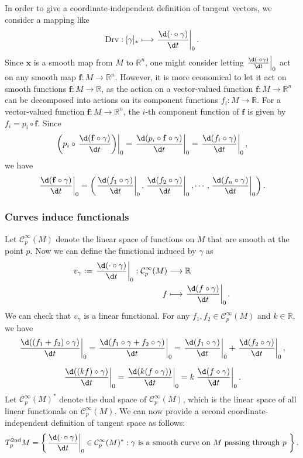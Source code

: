 \documentclass{report}
\begin{document}
In order to give a coordinate-independent definition of tangent vectors, we consider a mapping like
\[
    \mathrm{Drv}:[\gamma]_*\longmapsto\left.\frac{\d(\cdot \circ \gamma)}{\d t}\right|_0.
\]
Since $\mathbf{x}$ is a smooth map from $M$ to $\mathbb{R}^n$, one might consider letting $\left. \frac{\d(\cdot \circ \gamma)}{\d t} \right|_0$ act on any smooth map $\mathbf{f}:M\to\mathbb{R}^n$. However, it is more economical to let it act on smooth functions $\mathbf{f}:M\to\mathbb{R}$, as the action on a vector-valued function $\mathbf{f}:M\to\mathbb{R}^n$ can be decomposed into actions on its component functions $f_i:M\to\mathbb{R}$.
For a vector-valued function $\mathbf{f} : M \to \mathbb{R}^n$, the $i$-th component function of $\mathbf{f}$ is given by $f_i = p_i \circ \mathbf{f}$. Since
\[
    \left(p_i\circ\left.\frac{\d(\mathbf{f} \circ \gamma)}{\d t}\right)\right|_0=\left.\frac{\d(p_i\circ\mathbf{f} \circ \gamma)}{\d t}\right|_0=\left.\frac{\d(f_i \circ \gamma)}{\d t}\right|_0,
\]
we have
\[
    \left.\frac{\d(\mathbf{f} \circ \gamma)}{\d t}\right|_0=\left(\left.\frac{\d(f_1 \circ \gamma)}{\d t}\right|_0,\left.\frac{\d(f_2 \circ \gamma)}{\d t}\right|_0,\cdots,\left.\frac{\d(f_n \circ \gamma)}{\d t}\right|_0\right).
\]
\subsubsection{Curves induce functionals}
Let $\mathcal{C}^{\infty}_p(M)$ denote the linear space of functions on $M$ that are smooth at the point $p$. Now we can define the functional induced by $\gamma$ as 
\[
\begin{aligned}
    v_\gamma:=\left.\frac{\d(\cdot \circ
\gamma)}{\d t}\right|_0:\mathcal{C}^{\infty}_p(M)&\longrightarrow \mathbb{R}\\
    f&\longmapsto \left.\frac{\d(f \circ \gamma)}{\d t}\right|_0.
\end{aligned}
\]
We can check that $v_\gamma$ is a linear functional. For any $f_1,f_2\in\mathcal{C}^{\infty}_p(M)$ and $k\in\mathbb{R}$, we have
$$
\left.\frac{\d((f_1+f_2) \circ \gamma)}{\d t}\right|_0=\left.\frac{\d(f_1\circ \gamma+f_2\circ \gamma )}{\d t}\right|_0=\left.\frac{\d(f_1\circ \gamma)}{\d t}\right|_0+\left.\frac{\d(f_2\circ \gamma)}{\d t}\right|_0,
$$

$$
\left.\frac{\d((kf) \circ \gamma)}{\d t}\right|_0=\left.\frac{\d(k(f \circ \gamma))}{\d t}\right|_0=k\left.\frac{\d(f \circ \gamma)}{\d t}\right|_0.
$$
Let $\mathcal{C}^{\infty}_p(M)^*$ denote the dual space of $\mathcal{C}^{\infty}_p(M)$, which is the linear space of all linear functionals on $\mathcal{C}^{\infty}_p(M)$. We can now provide a second coordinate-independent definition of tangent space as follows:
$$
T^{2\mathrm{nd}}_pM=\left\{\left.\frac{\d(\cdot \circ \gamma)}{\d t}\right|_0\in\mathcal{C}^{\infty}_p(M)^*:\gamma\text{ is a smooth curve on $M$ passing through $p$ }\right\}.
$$
\end{document}
